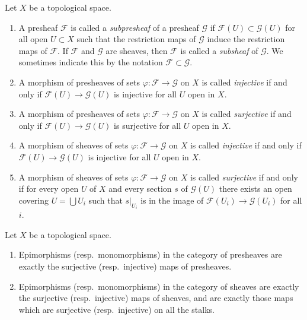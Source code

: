 \begin{definition}
\label{definition-injective-surjective}
Let $X$ be a topological space.
\begin{enumerate}
\item A presheaf $\mathcal{F}$ is called a {\it subpresheaf} of a presheaf
$\mathcal{G}$ if $\mathcal{F}(U) \subset \mathcal{G}(U)$ for all open
$U \subset X$ such that the restriction maps of $\mathcal{G}$ induce the
restriction maps of $\mathcal{F}$. If $\mathcal{F}$ and
$\mathcal{G}$ are sheaves, then $\mathcal{F}$ is called a {\it subsheaf}
of $\mathcal{G}$. We sometimes indicate this by the notation
$\mathcal{F} \subset \mathcal{G}$.
\item A morphism of presheaves of sets $\varphi : \mathcal{F} \to \mathcal{G}$
on $X$ is called {\it injective} if and only if
$\mathcal{F}(U) \to \mathcal{G}(U)$ is injective for all $U$ open in $X$.
\item A morphism of presheaves of sets $\varphi : \mathcal{F} \to \mathcal{G}$
on $X$ is called {\it surjective} if and only if
$\mathcal{F}(U) \to \mathcal{G}(U)$ is surjective for all $U$ open in $X$.
\item A morphism of sheaves of sets $\varphi : \mathcal{F} \to \mathcal{G}$
on $X$ is called {\it injective} if and only if
$\mathcal{F}(U) \to \mathcal{G}(U)$ is injective for all $U$ open in $X$.
\item A morphism of sheaves of sets $\varphi : \mathcal{F} \to \mathcal{G}$
on $X$ is called {\it surjective} if and only if for every open
$U$ of $X$ and every section $s$ of $\mathcal{G}(U)$ there exists an
open covering $U = \bigcup U_i$ such that $s|_{U_i}$ is in
the image of $\mathcal{F}(U_i) \to \mathcal{G}(U_i)$ for all $i$.
\end{enumerate}
\end{definition}


\begin{lemma}
\label{lemma-characterize-epi-mono}
Let $X$ be a topological space.
\begin{enumerate}
\item Epimorphisms (resp.\ monomorphisms) in the category of
presheaves are exactly the surjective (resp.\ injective) maps
of presheaves.
\item Epimorphisms (resp.\ monomorphisms) in the category of
sheaves are exactly the surjective (resp.\ injective) maps
of sheaves, and are exactly those maps which are surjective
(resp.\ injective) on all the stalks.
\end{enumerate}
\end{lemma}

